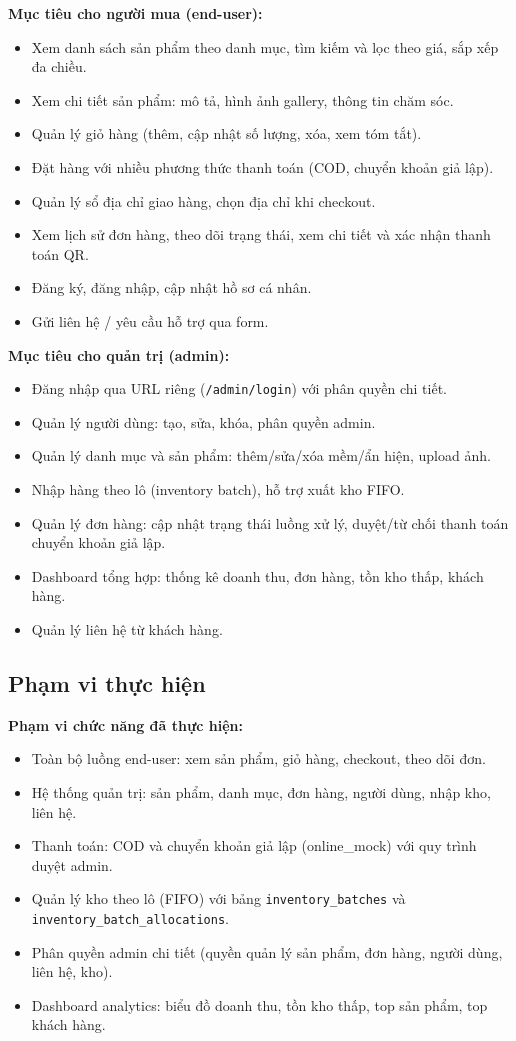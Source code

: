 \documentclass[a4paper]{article}
\begin{document}
\textbf{Mục tiêu cho người mua (end-user):}
\begin{itemize}
    \item Xem danh sách sản phẩm theo danh mục, tìm kiếm và lọc theo giá, sắp xếp đa chiều.
    \item Xem chi tiết sản phẩm: mô tả, hình ảnh gallery, thông tin chăm sóc.
    \item Quản lý giỏ hàng (thêm, cập nhật số lượng, xóa, xem tóm tắt).
    \item Đặt hàng với nhiều phương thức thanh toán (COD, chuyển khoản giả lập).
    \item Quản lý sổ địa chỉ giao hàng, chọn địa chỉ khi checkout.
    \item Xem lịch sử đơn hàng, theo dõi trạng thái, xem chi tiết và xác nhận thanh toán QR.
    \item Đăng ký, đăng nhập, cập nhật hồ sơ cá nhân.
    \item Gửi liên hệ / yêu cầu hỗ trợ qua form.
\end{itemize}

\textbf{Mục tiêu cho quản trị (admin):}
\begin{itemize}
    \item Đăng nhập qua URL riêng (\texttt{/admin/login}) với phân quyền chi tiết.
    \item Quản lý người dùng: tạo, sửa, khóa, phân quyền admin.
    \item Quản lý danh mục và sản phẩm: thêm/sửa/xóa mềm/ẩn hiện, upload ảnh.
    \item Nhập hàng theo lô (inventory batch), hỗ trợ xuất kho FIFO.
    \item Quản lý đơn hàng: cập nhật trạng thái luồng xử lý, duyệt/từ chối thanh toán chuyển khoản giả lập.
    \item Dashboard tổng hợp: thống kê doanh thu, đơn hàng, tồn kho thấp, khách hàng.
    \item Quản lý liên hệ từ khách hàng.
\end{itemize}

\subsection{Phạm vi thực hiện}

\textbf{Phạm vi chức năng đã thực hiện:}
\begin{itemize}
    \item Toàn bộ luồng end-user: xem sản phẩm, giỏ hàng, checkout, theo dõi đơn.
    \item Hệ thống quản trị: sản phẩm, danh mục, đơn hàng, người dùng, nhập kho, liên hệ.
    \item Thanh toán: COD và chuyển khoản giả lập (online\_mock) với quy trình duyệt admin.
    \item Quản lý kho theo lô (FIFO) với bảng \texttt{inventory\_batches} và \texttt{inventory\_batch\_allocations}.
    \item Phân quyền admin chi tiết (quyền quản lý sản phẩm, đơn hàng, người dùng, liên hệ, kho).
    \item Dashboard analytics: biểu đồ doanh thu, tồn kho thấp, top sản phẩm, top khách hàng.
\end{itemize}
\end{document}

